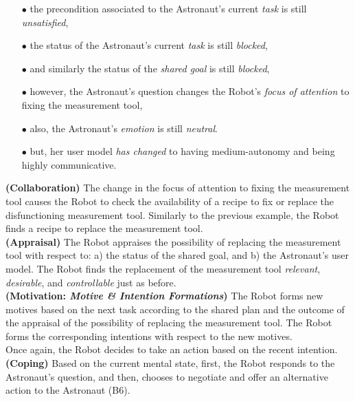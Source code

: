 \begin{itemize}
  \item[$\bullet$] the precondition associated to the Astronaut's current
  \textit{task} is still \textit{unsatisfied},
  \item[$\bullet$] the status of the Astronaut's current \textit{task} is still
  \textit{blocked},
  \item[$\bullet$] and similarly the status of the \textit{shared goal} is
  still \textit{blocked},
  \item[$\bullet$] however, the Astronaut's question changes the Robot's
  \textit{focus of attention} to fixing the measurement tool,
  \item[$\bullet$] also, the Astronaut's \textit{emotion} is still
  \textit{neutral}.
  \item[$\bullet$] but, her user model \textit{has changed} to having
  medium-autonomy and being highly communicative.
\end{itemize}

\noindent\textbf{(Collaboration)} The change in the focus of attention to fixing
the measurement tool causes the Robot to check the availability of a recipe to
fix or replace the disfunctioning measurement tool. Similarly to the previous
example, the Robot finds a recipe to replace the measurement tool.\\

\noindent\textbf{(Appraisal)} The Robot appraises the possibility of replacing
the measurement tool with respect to: a) the status of the shared goal, and b)
the Astronaut's user model. The Robot finds the replacement of the measurement
tool \textit{relevant}, \textit{desirable}, and \textit{controllable} just as
before.\\

\noindent\textbf{(Motivation: \textit{Motive \& Intention Formations})} The
Robot forms new motives based on the next task according to the shared plan and
the outcome of the appraisal of the possibility of replacing the measurement
tool. The Robot forms the corresponding intentions with respect to the new
motives.\\

\noindent Once again, the Robot decides to take an action based on the recent
intention.\\

\noindent\textbf{(Coping)} Based on the current mental state, first, the Robot
responds to the Astronaut's question, and then, chooses to negotiate and offer
an alternative action to the Astronaut (B6).\\

